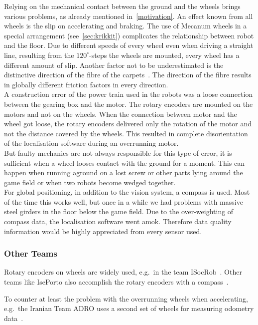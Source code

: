 \documentclass[12pt,a4paper]{article}
\begin{document}
Relying on the mechanical contact between the ground and the wheels brings various problems, as already mentioned in~\autoref{motivation}.
An effect known from all wheels is the slip on accelerating and braking.
The use of Mecanum wheels in a special arrangement (see~\autoref{sec:krikkit}) complicates the relationship between robot and the floor. %
Due to different speeds of every wheel even when driving a straight line, resulting from the $120^\circ$\mbox{-}steps the wheels are mounted, every wheel has a different amount of slip.
Another factor not to be underestimated is the distinctive direction of the fibre of the carpets~\cite{mecanum2007}.
The direction of the fibre results in globally different friction factors in every direction.\\
A construction error of the power train used in the %
robots was a loose connection between the gearing box and the motor.
The rotary encoders are mounted on the motors and not on the wheels.
When the connection between motor and the wheel got loose, the rotary encoders delivered only the rotation of the motor and not the distance covered by the wheels. 
This resulted in complete disorientation of the localisation software during an overrunning motor.\\
But faulty mechanics are not always responsible for this type of error, it is sufficient when a wheel looses contact with the ground for a moment.
This can happen when running aground on a lost screw or other parts lying around the game field or when two robots become wedged together.\\
For global positioning, in addition to the vision system, a compass is used.
Most of the time this works well, but once in a while we had problems with massive steel girders in the floor below the game field.
Due to the over-weighting of compass data, the localisation software went amok.
Therefore data quality information would be highly appreciated from every sensor used.

\subsubsection{Other Teams}

Rotary encoders on wheels are widely used, e.g.\ in the team ISocRob~\cite{isocrob}.
Other teams like IsePorto also accomplish the rotary encoders with a compass~\cite{iseporto}.

To counter at least the problem with the overrunning wheels when accelerating, e.g.\ the Iranian Team ADRO uses a second set of wheels for measuring odometry data~\cite{adro}.
\end{document}
